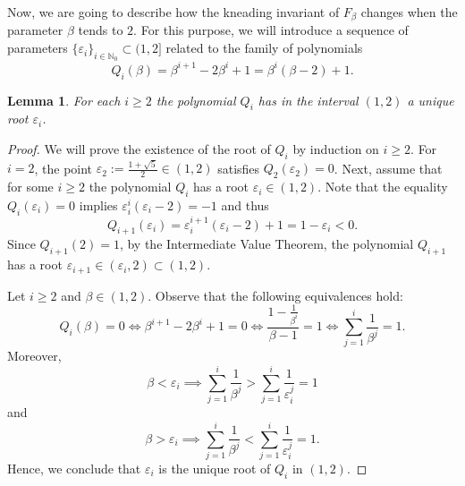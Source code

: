 \documentclass[10pt,reqno]{amsart}
\theoremstyle{plain}
\theoremstyle{assumption}
\theoremstyle{notation}
\theoremstyle{claim}
\theoremstyle{conj}
\theoremstyle{theorem}
\theoremstyle{proposition}
\theoremstyle{corollary}
\newtheorem{lemma}{Lemma}[section]
\begin{document}
Now, we are going to describe how the kneading invariant of $F_{\beta}$ changes when the parameter $\beta$ tends to $2$. For this purpose, we will introduce a sequence of parameters $\{\varepsilon_i\}_{i\in\mathbb{N}_0}\subset(1,2]$ related to the family of polynomials
\begin{equation}\label{eq:polynomials}
    Q_i(\beta)=\beta^{i+1}-2\beta^i+1=\beta^i(\beta-2)+1.
\end{equation}

\begin{lemma}\label{lem:polynomials}
    For each $i\geq2$ the polynomial $Q_i$ has in the interval $(1,2)$ a unique root $\varepsilon_i$.
\end{lemma}
\begin{proof}
We will prove the existence of the root of $Q_i$ by induction on $i\geq2$. For $i=2$, the point $\varepsilon_2:=\frac{1+\sqrt{5}}{2}\in(1,2)$ satisfies $Q_2(\varepsilon_2)=0$. Next, assume that for some $i\geq2$ the polynomial $Q_i$ has a root $\varepsilon_i\in(1,2)$. Note that the equality $Q_i(\varepsilon_i)=0$ implies $\varepsilon_i^i(\varepsilon_i-2)=-1$ and thus
$$
Q_{i+1}(\varepsilon_i)=\varepsilon_i^{i+1}(\varepsilon_i-2)+1=1-\varepsilon_i<0.
$$
Since $Q_{i+1}(2)=1$, by the Intermediate Value Theorem, the polynomial $Q_{i+1}$ has a root $\varepsilon_{i+1}\in(\varepsilon_i,2)\subset(1,2)$.

Let $i\geq2$ and $\beta\in(1,2)$. Observe that the following equivalences hold:
\begin{equation}\label{eq:root_equiv}
Q_i(\beta)=0\iff\beta^{i+1}-2\beta^i+1=0\iff\frac{1-\frac{1}{\beta^i}}{\beta-1}=1\iff\sum_{j=1}^i\frac{1}{\beta^j}=1.
\end{equation}
Moreover,
$$
\beta<\varepsilon_i\implies\sum_{j=1}^i\frac{1}{\beta^j}>\sum_{j=1}^i\frac{1}{\varepsilon_i^j}=1
$$
and
$$
\beta>\varepsilon_i\implies\sum_{j=1}^i\frac{1}{\beta^j}<\sum_{j=1}^i\frac{1}{\varepsilon_i^j}=1.
$$
Hence, we conclude that $\varepsilon_i$ is the unique root of $Q_i$ in $(1,2)$.
\end{proof}
\end{document}
